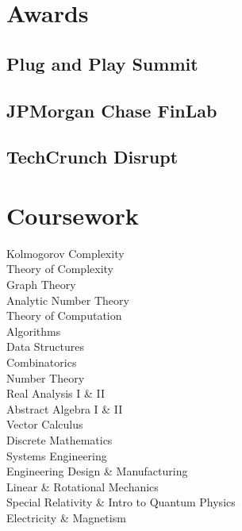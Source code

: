\documentclass[]{jhearn-resume}
\begin{document}
\begin{minipage}[t]{0.34\textwidth} 

\vspace{25pt}

\vspace{-\topsep}

\section{Awards}
\subsection{Plug and Play Summit}
\sectionsep

\subsection{JPMorgan Chase FinLab}
\sectionsep

\subsection{TechCrunch Disrupt}
\sectionsep


\section{Coursework}
\small Kolmogorov Complexity\\
Theory of Complexity\\
Graph Theory\\
Analytic Number Theory\\
Theory of Computation \\
Algorithms \\
Data Structures \\
Combinatorics \\
Number Theory \\
Real Analysis I \& II \\
Abstract Algebra I \& II\\
Vector Calculus\\
Discrete Mathematics\\
Systems Engineering\\
Engineering Design \& Manufacturing\\
Linear \& Rotational Mechanics\\
Special Relativity \& Intro to Quantum Physics\\
Electricity \& Magnetism\\
\sectionsep
\vspace{-\topsep}

\end{minipage}
\end{document}
